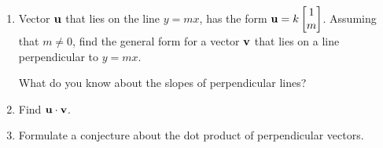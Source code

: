 \documentclass{ximera}
\renewcommand{\vec}[1]{{\bf #1}}
\newcommand{\dotp}{\cdot}
\begin{document}
\begin{problem}
  \begin{enumerate}
    \item Vector $\vec{u}$ that lies on the line $y=mx$, has the form $\vec{u}=k\begin{bmatrix}1\\m\end{bmatrix}$.  Assuming that $m\neq 0$, find the general form for a vector $\vec{v}$ that lies on a line perpendicular to $y=mx$.
      \begin{hint}
        What do you know about the slopes of perpendicular
        lines?
      \end{hint}
    \item Find $\vec{u}\dotp \vec{v}$.
    \item Formulate a conjecture about the dot product of perpendicular vectors.
  \end{enumerate}
\end{problem}
\end{document}
